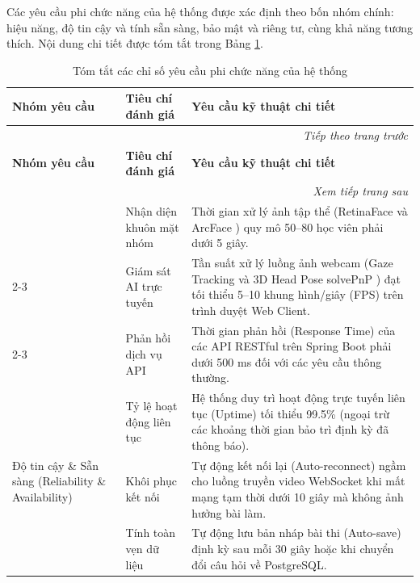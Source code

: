 \documentclass[../DoAn.tex]{subfiles}
\begin{document}
Các yêu cầu phi chức năng của hệ thống được xác định theo bốn nhóm chính: hiệu năng, độ tin cậy và tính sẵn sàng, bảo mật và riêng tư, cùng khả năng tương thích. Nội dung chi tiết được tóm tắt trong Bảng \ref{table:non_functional_requirements}.

\begin{longtable}{|p{3cm}|p{3.5cm}|p{8.2cm}|}
    \caption{Tóm tắt các chỉ số yêu cầu phi chức năng của hệ thống}
    \label{table:non_functional_requirements}\\
        \hline
        \textbf{Nhóm yêu cầu} & \textbf{Tiêu chí đánh giá} & \textbf{Yêu cầu kỹ thuật chi tiết} \\ \hline
    \endfirsthead
    \multicolumn{3}{r}{\textit{Tiếp theo trang trước}} \\
    \hline
    \textbf{Nhóm yêu cầu} & \textbf{Tiêu chí đánh giá} & \textbf{Yêu cầu kỹ thuật chi tiết} \\ \hline
    \endhead
    \hline
    \multicolumn{3}{r}{\textit{Xem tiếp trang sau}} \\
    \endfoot
    \hline
    \endlastfoot
        \multirow{3}{3cm}{Hiệu năng (Performance)} & Nhận diện khuôn mặt nhóm & Thời gian xử lý ảnh tập thể (RetinaFace \cite{Deng_2020_CVPR} và ArcFace \cite{Deng_2019_CVPR}) quy mô 50--80 học viên phải dưới 5 giây. \\ \cline{2-3}
         & Giám sát AI trực tuyến & Tần suất xử lý luồng ảnh webcam (Gaze Tracking \cite{kaundinya2026inbrowser} và 3D Head Pose solvePnP \cite{Lepetit2009EPnP}) đạt tối thiểu 5--10 khung hình/giây (FPS) trên trình duyệt Web Client. \\ \cline{2-3}
         & Phản hồi dịch vụ API & Thời gian phản hồi (Response Time) của các API RESTful trên Spring Boot phải dưới 500 ms đối với các yêu cầu thông thường. \\ \hline
        \multirow{3}{3.2cm}{Độ tin cậy \& Sẵn sàng (Reliability \& Availability)} & Tỷ lệ hoạt động liên tục & Hệ thống duy trì hoạt động trực tuyến liên tục (Uptime) tối thiểu 99.5\% (ngoại trừ các khoảng thời gian bảo trì định kỳ đã thông báo). \\ \cline{2-3}
         & Khôi phục kết nối & Tự động kết nối lại (Auto-reconnect) ngầm cho luồng truyền video WebSocket khi mất mạng tạm thời dưới 10 giây mà không ảnh hưởng bài làm. \\ \cline{2-3}
         & Tính toàn vẹn dữ liệu & Tự động lưu bản nháp bài thi (Auto-save) định kỳ sau mỗi 30 giây hoặc khi chuyển đổi câu hỏi về PostgreSQL. \\ \hline

\end{longtable}
\end{document}
